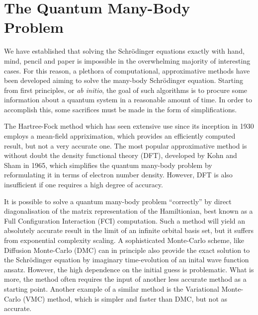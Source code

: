 \section{The Quantum Many-Body Problem}

    We have established that solving the Schrödinger equations exactly with hand, mind, 
    pencil and paper is 
    impossible in the overwhelming majority of interesting cases. For this reason, 
    a plethora of computational, approximative methods have been developed aiming 
    to solve the many-body Schrödinger equation. Starting from first principles,
    or \emph{ab initio}, the goal of such algorithms is to procure some information
    about a quantum system in a reasonable amount of time. In order to accomplish 
    this, some sacrifices must be made in the form of simplifications. 

    The Hartree-Fock
    method\cite{hartree1928wave,fock1930naherungsmethode,szabo2012modern} which 
    has seen extensive use since its inception in 1930
    employs a mean-field appriximation, which provides an efficiently computed result, 
    but not a very accurate one. The most popular approximative method is without doubt 
    the density functional theory (DFT), developed by Kohn and Sham in
    1965\cite{kohn1965self}, which simplifies the quantum many-body problem by reformulating 
    it in terms of electron number density. However, DFT is also insufficient if one requires a 
    high degree of accuracy.

    It is possible to solve a quantum many-body problem  ``correctly'' by direct diagonalisation 
    of the matrix representation of the Hamiltionian, best known as a Full Configuration Interaction
    (FCI) computation. Such a method 
    will yield an absolutely accurate result in the limit of an infinite orbital basis set,
    but it suffers from exponential complexity scaling\cite{helgaker2014molecular}.
    A sophisticated Monte-Carlo scheme, like Diffusion Monte-Carlo (DMC) can in principle 
    also provide the exact solution to the Schrödinger equation by imaginary time-evolution 
    of an inital wave function ansatz\cite{hammond1994monte}. However, the high dependence on the 
    initial guess is problematic. What is more, the method often requires the input of
    another less accurate method as a starting point. Another 
    example of a similar method is the Variational Monte-Carlo (VMC) method, which is
    simpler and faster than DMC, but not as accurate.


